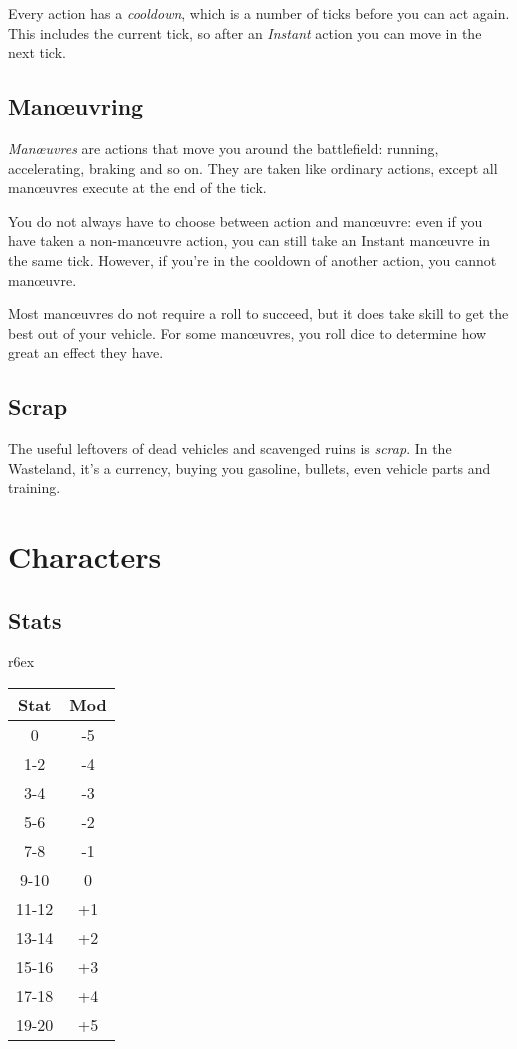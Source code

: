 \documentclass[10pt, a4paper, twocolumn]{article}
\begin{document}
Every action has a \emph{cooldown}, which is a number of ticks before you can act again. This includes the current tick, so after an \emph{Instant} action you can move in the next tick.

\subsection{Man\oe{}uvring}
\emph{Man\oe{}uvres} are actions that move you around the battlefield: running, accelerating, braking and so on. They are taken like ordinary actions, except all man\oe{}uvres execute at the end of the tick.

You do not always have to choose between action and man\oe{}uvre: even if you have taken a non-man\oe{}uvre action, you can still take an Instant man\oe{}uvre in the same tick. However, if you're in the cooldown of another action, you cannot man\oe{}uvre.

Most man\oe{}uvres do not require a roll to succeed, but it does take skill to get the best out of your vehicle. For some man\oe{}uvres, you roll dice to determine how great an effect they have.

\subsection{Scrap}
The useful leftovers of dead vehicles and scavenged ruins is \emph{scrap}. In the Wasteland, it's a currency, buying you gasoline, bullets, even vehicle parts and training.

\section{Characters}
\subsection{Stats}

\begin{wraptable}[9]{r}{6ex}
  \small
\vspace*{-8ex}
\hspace*{-4.5ex}
\begin{tabular}{cc}
  Stat  & Mod \\
  \hline
  0     & -5       \\
  1-2   & -4       \\
  3-4   & -3       \\
  5-6   & -2       \\
  7-8   & -1       \\
  9-10  &  0       \\
  11-12 & +1       \\
  13-14 & +2       \\
  15-16 & +3       \\
  17-18 & +4       \\
  19-20 & +5
\end{tabular}
\end{wraptable}
\end{document}
